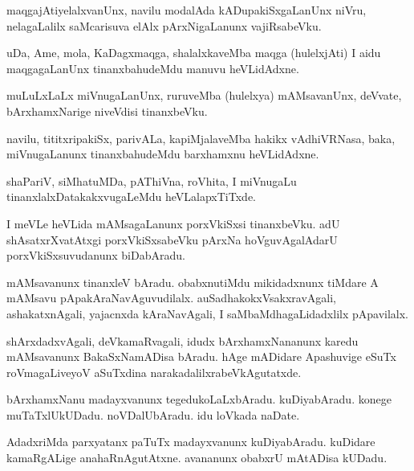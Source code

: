 \documentclass{article}
\begin{document}
\begin{mn}
maqgajAtiyelalxvanUnx, navilu modalAda kADupakiSxgaLanUnx niVru, nelagaLalilx saMcarisuva elAlx 
pArxNigaLanunx vajiRsabeVku.
\end{mn}

\begin{mn}
uDa, Ame, mola, KaDagxmaqga, shalalxkaveMba maqga (hulelxjAti) I aidu maqgagaLanUnx 
tinanxbahudeMdu manuvu heVLidAdxne.
\end{mn}

\begin{mn}
muLuLxLaLx miVnugaLanUnx, ruruveMba (hulelxya) mAMsavanUnx, deVvate, bArxhamxNarige niveVdisi 
tinanxbeVku.
\end{mn}

\begin{mn}
navilu, tititxripakiSx, parivALa, kapiMjalaveMba hakikx vAdhiVRNasa, baka, miVnugaLanunx 
tinanxbahudeMdu barxhamxnu heVLidAdxne.
\end{mn}

\begin{mn}
shaPariV, siMhatuMDa, pAThiVna, roVhita, I miVnugaLu tinanxlalxDatakakxvugaLeMdu heVLalapxTiTxde.
\end{mn}

\begin{mn}
I meVLe heVLida mAMsagaLanunx porxVkiSxsi tinanxbeVku. adU shAsatxrXvatAtxgi porxVkiSxsabeVku 
pArxNa hoVguvAgalAdarU porxVkiSxsuvudanunx biDabAradu.
\end{mn}

\begin{mn}
mAMsavanunx tinanxleV bAradu. obabxnutiMdu mikidadxnunx tiMdare A mAMsavu pApakAraNavAguvudilalx. 
auSadhakokxVsakxravAgali, ashakatxnAgali, yajacnxda kAraNavAgali, I saMbaMdhagaLidadxlilx 
pApavilalx.
\end{mn}

\begin{mn}
shArxdadxvAgali, deVkamaRvagali, idudx bArxhamxNananunx karedu mAMsavanunx BakaSxNamADisa 
bAradu. hAge mADidare Apashuvige eSuTx roVmagaLiveyoV aSuTxdina narakadalilxrabeVkAgutatxde.
\end{mn}

\begin{mn}
bArxhamxNanu madayxvanunx tegedukoLaLxbAradu. kuDiyabAradu. konege muTaTxlUkUDadu. noVDalUbAradu. 
idu loVkada naDate.
\end{mn}

\begin{mn}
AdadxriMda parxyatanx paTuTx madayxvanunx kuDiyabAradu. kuDidare kamaRgALige anahaRnAgutAtxne. 
avananunx obabxrU mAtADisa kUDadu.
\end{mn}
\end{document}
